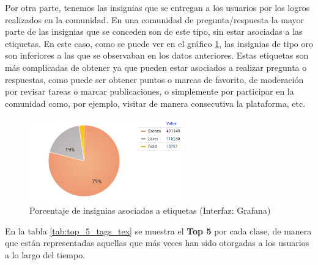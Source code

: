 \documentclass[a4paper, 12pt]{book}
\begin{document}
Por otra parte, tenemos las insignias que se entregan a los usuarios por los logros realizados en la comunidad. En una comunidad de pregunta/respuesta la mayor parte de las insignias que se conceden son de este tipo, sin estar asociadas a las etiquetas. En este caso, como se puede ver en el gráfico \ref{figura:badges_tex_dist}, las insignias de tipo oro son inferiores a las que se observaban en los datos anteriores. Estas etiquetas son más complicadas de obtener ya que pueden estar asociados a realizar pregunta o respuestas, como puede ser obtener puntos  o marcas de favorito, de moderación por revisar tareas o marcar publicaciones, o simplemente por participar en la comunidad como, por ejemplo, visitar de manera consecutiva la plataforma, etc. 

\begin{figure}[ht]
    \centering
    \includegraphics[width=0.6\textwidth]{img/tex/Badges_tex_dist.png}
    \caption{Porcentaje de insignias asociadas a etiquetas (Interfaz: Grafana)}
    \label{figura:badges_tex_dist}
\end{figure}

En la tabla \ref{tab:top_5_tags_tex} se muestra el \textbf{Top 5} por cada clase, de manera que están representadas aquellas que más veces han sido otorgadas a los usuarios a lo largo del tiempo. 
\end{document}
